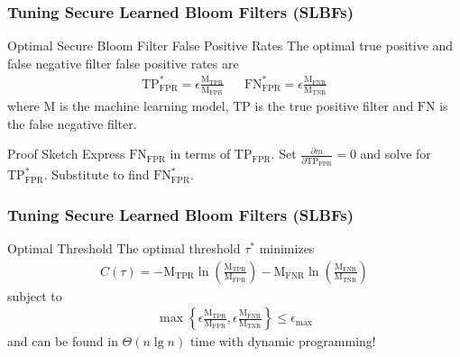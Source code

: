 \documentclass{beamer}
\begin{document}
\begin{frame}
\frametitle{Tuning Secure Learned Bloom Filters (SLBFs)}

\begin{block}{Optimal Secure Bloom Filter False Positive Rates}
    The optimal true positive and false negative filter false positive rates are
    \begin{align*}
        \text{TP}_\text{FPR}^* = \epsilon \frac{\text{M}_\text{TPR}}{\text{M}_\text{FPR}} && \text{FN}_\text{FPR}^* = \epsilon \frac{\text{M}_\text{FNR}}{\text{M}_\text{TNR}}
    \end{align*}
    where $\text{M}$ is the machine learning model, $\text{TP}$ is the true positive filter and $\text{FN}$ is the false negative filter.
\end{block}

\begin{block}{Proof Sketch}
    Express $\text{FN}_\text{FPR}$ in terms of $\text{TP}_\text{FPR}$. Set $\frac{\partial m}{\partial \text{TP}_\text{FPR}} = 0$ and solve for $\text{TP}_\text{FPR}^*$. Substitute to find $\text{FN}_\text{FPR}^*$.
\end{block}

\end{frame}


\begin{frame}
\frametitle{Tuning Secure Learned Bloom Filters (SLBFs)}

\begin{block}{Optimal Threshold}
    The optimal threshold $\tau^*$ minimizes
    \begin{align*}
        C(\tau) = -\text{M}_\text{TPR} \ln \left( \frac{\text{M}_\text{TPR}}{\text{M}_\text{FPR}} \right) 
 - \text{M}_\text{FNR} \ln \left( \frac{\text{M}_\text{FNR}}{\text{M}_\text{TNR}}\right)
    \end{align*}
    subject to
    \begin{align*}
        \max\left\{\epsilon\frac{\text{M}_\text{TPR}}{\text{M}_\text{FPR}}, \epsilon \frac{\text{M}_\text{FNR}}{\text{M}_\text{TNR}} \right\} \leq \epsilon_\text{max}
    \end{align*}
    and can be found in $\Theta(n \lg n)$ time with dynamic programming!
\end{block}

\end{frame}
\end{document}
